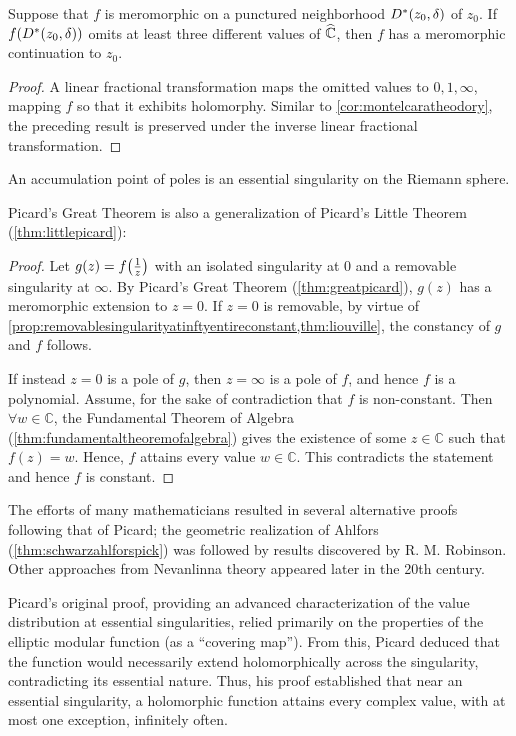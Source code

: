 \begin{corollary}[store=cor:greatpicardmeromorphic]\label{cor:greatpicardmeromorphic}
    Suppose that \(f\) is meromorphic on a punctured neighborhood \(D^*\qty(z_0,\delta)\) of \(z_0\). If \(f\qty(D^*\qty(z_0,\delta))\) omits at least three different values of \(\widehat{\mathbb{C}}\), then \(f\) has a meromorphic continuation to \(z_0\).
\end{corollary}
\begin{proof}
    A linear fractional transformation maps the omitted values to \(0,1,\infty\), mapping \(f\) so that it exhibits holomorphy. Similar to \cref{cor:montelcaratheodory}, the preceding result is preserved under the inverse linear fractional transformation.
\end{proof}
\begin{remark}
    An accumulation point of poles is an essential singularity on the Riemann sphere.
\end{remark}
Picard's Great Theorem is also a generalization of Picard's Little Theorem (\cref{thm:littlepicard}):
\begin{proof}
    Let \(g(z)=f\qty(\frac 1z)\) with an isolated singularity at 0 and a removable singularity at \(\infty\). By Picard's Great Theorem (\cref{thm:greatpicard}), \(g(z)\) has a meromorphic extension to \(z=0\). If \(z=0\) is removable, by virtue of \cref{prop:removablesingularityatinftyentireconstant,thm:liouville}, the constancy of \(g\) and \(f\) follows.

    If instead \(z=0\) is a pole of \(g\), then \(z=\infty\) is a pole of \(f\), and hence \(f\) is a polynomial. Assume, for the sake of contradiction that \(f\) is non-constant. Then \(\forall w\in\mathbb{C}\), the Fundamental Theorem of Algebra (\cref{thm:fundamentaltheoremofalgebra}) gives the existence of some \(z\in\mathbb{C}\) such that \(f(z)=w\). Hence, \(f\) attains every value \(w\in\mathbb{C}\). This contradicts the statement and hence \(f\) is constant.
\end{proof}
The efforts of many mathematicians resulted in several alternative proofs following that of Picard; the geometric realization of Ahlfors (\cref{thm:schwarzahlforspick}) was followed by results discovered by R. M. Robinson. Other approaches from Nevanlinna theory appeared later in the 20th century.

Picard's original proof, providing an advanced characterization of the value distribution at essential singularities, relied primarily on the properties of the elliptic modular function (as a ``covering map''). From this, Picard deduced that the function would necessarily extend holomorphically across the singularity, contradicting its essential nature. Thus, his proof established that near an essential singularity, a holomorphic function attains every complex value, with at most one exception, infinitely often.


